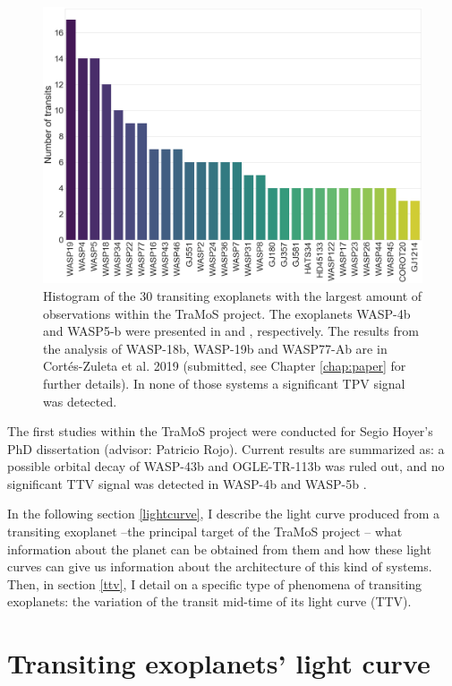 \begin{figure}[ht]
\centering
\includegraphics[width=0.9\columnwidth]{imagenes/tramos.png}
\caption{Histogram of the 30 transiting exoplanets with the largest amount of observations within the TraMoS project. The exoplanets WASP-4b and WASP5-b were presented in \cite{Hoyer2012} and \cite{Hoyer2013}, respectively. The results from the analysis of WASP-18b, WASP-19b and WASP77-Ab are in Cortés-Zuleta et al. 2019 (submitted, see Chapter \ref{chap:paper} for further details). In none of those systems a significant TPV signal was detected.}
\label{tramos}
\end{figure}


The first studies within the TraMoS project were conducted for Segio Hoyer's PhD dissertation (advisor: Patricio Rojo). Current results are summarized as: a possible orbital decay of WASP-43b \citep{Hoyer2016b} and OGLE-TR-113b \citep{Hoyer2016} was ruled out, and no significant TTV signal was detected in WASP-4b \citep{Hoyer2012} and WASP-5b \citep{Hoyer2013}.

In the following section \ref{lightcurve}, I describe the light curve produced from a transiting exoplanet --the principal target of the TraMoS project --  what information about the planet can be obtained from them and how these light curves can give us information about the architecture of this kind of systems. Then, in section \ref{ttv}, I detail on a specific type of phenomena of transiting exoplanets: the variation of the transit mid-time of its light curve (TTV).

\section{Transiting exoplanets' light curve\label{lightcurve}}

